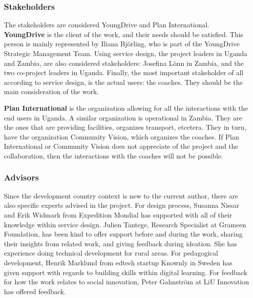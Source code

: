 \subsubsection{Stakeholders}
The stakeholders are considered YoungDrive and Plan International. \textbf{YoungDrive} is the client of the work, and their needs should be satisfied. This person is mainly represented by Iliana Björling, who is part of the YoungDrive Strategic Management Team. Using service design, the project leaders in Uganda and Zambia, are also considered stakeholders: Josefina Lönn in Zambia, and the two co-project leaders in Uganda. Finally, the most important stakeholder of all according to service design, is the actual users: the coaches. They should be the main consideration of the work.

\textbf{Plan International} is the organization allowing for all the interactions with the end users in Uganda. A similar organization is operational in Zambia. They are the ones that are providing facilities, organizes transport, etcetera. They in turn, have the organization Community Vision, which organizes the coaches. If Plan International or Community Vision does not appreciate of the project and the collaboration, then the interactions with the coaches will not be possible.


\subsubsection{Advisors}
Since the development country context is new to the current author, there are also specific experts advised in the project. For design process, Susanna Nissar and Erik Widmark from Expedition Mondial has supported with all of their knowledge within service design. Julien Tantege, Research Specialist at Grameen Foundation, has been kind to offer support before and during the work, sharing their insights from related work, and giving feedback during ideation. She has experience doing technical development for rural areas. For pedagogical development, Henrik Marklund from edtech startup Knownly in Sweden has given support with regards to building skills within digital learning. For feedback for how the work relates to social innovation, Peter Gahnström at LiU Innovation has offered feedback.

